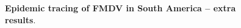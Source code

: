 \documentclass[a4paper,10pt]{article}
\begin{document}
\begin{center}
\begin{figure}[H]
\begin{center}
\end{center}
\caption{\textbf{Epidemic tracing of FMDV in South America -- extra results}.
}
\label{sfig:epitrac}
\end{figure}
\end{center}
\end{document}
